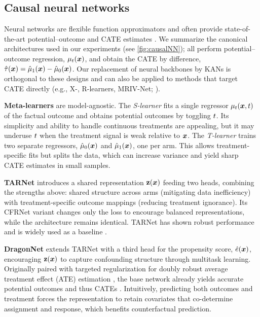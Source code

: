 \subsection{Causal neural networks}
\label{sec:causalNN}

Neural networks are flexible function approximators \citep{hornik1989multilayer} and often provide state-of-the-art potential–outcome and CATE estimates \citep{alaa2018limits,curth2021nonparametric,tesei2023learning}. We summarize the canonical architectures used in our experiments (see \cref{fig:causalNN}); all perform potential–outcome regression, $\mu_t({\bm{x}})$, and obtain the CATE by difference, $\hat{\tau}({\bm{x}})=\hat{\mu}_1({\bm{x}})-\hat{\mu}_0({\bm{x}})$. Our replacement of neural backbones by KANs is orthogonal to these designs and can also be applied to methods that target CATE directly (e.g., X-, R-learners, MRIV-Net; \citealp{kunzel2019metalearners,nie2021quasi,frauen2022estimating}).

\textbf{Meta-learners} \citep{kunzel2019metalearners} are model-agnostic. The \emph{S-learner} fits a single regressor $\mu_t({\bm{x}},t)$ of the factual outcome and obtains potential outcomes by toggling $t$. Its simplicity and ability to handle continuous treatments are appealing, but it may underuse $t$ when the treatment signal is weak relative to ${\bm{x}}$. The \emph{T-learner} trains two separate regressors, $\hat{\mu}_0({\bm{x}})$ and $\hat{\mu}_1({\bm{x}})$, one per arm. This allows treatment-specific fits but splits the data, which can increase variance and yield sharp CATE estimates in small samples.

\textbf{TARNet} \citep{shalit2017estimating} introduces a shared representation ${\mathbf{z}}({\bm{x}})$ feeding two heads, combining the strengths above: shared structure across arms (mitigating data inefficiency) with treatment-specific outcome mappings (reducing treatment ignorance). Its CFRNet variant changes only the loss to encourage balanced representations, while the architecture remains identical. TARNet has shown robust performance and is widely used as a baseline \citep{shalit2017estimating,schwab2018perfect,curth2021inductive,yao2018representation,curth2021nonparametric}.

\textbf{DragonNet} \citep{shi2019adapting} extends TARNet with a third head for the propensity score, $\hat{e}({\bm{x}})$, encouraging ${\mathbf{z}}({\bm{x}})$ to capture confounding structure through multitask learning. Originally paired with targeted regularization for doubly robust average treatment effect (ATE) estimation \citep{van2011targeted}, the base network already yields accurate potential outcomes and thus CATEs \citep{curth2021nonparametric,lolak2025application,ling2023emulate}. Intuitively, predicting both outcomes and treatment forces the representation to retain covariates that co-determine assignment and response, which benefits counterfactual prediction. 

